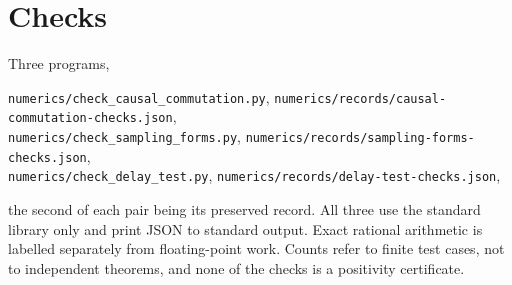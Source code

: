 \section{Checks}\label{app:checks}

Three programs,
\begin{center}
\texttt{numerics/check\_causal\_commutation.py},\qquad
\texttt{numerics/records/causal-commutation-checks.json},\\[2pt]
\texttt{numerics/check\_sampling\_forms.py},\qquad
\texttt{numerics/records/sampling-forms-checks.json},\\[2pt]
\texttt{numerics/check\_delay\_test.py},\qquad
\texttt{numerics/records/delay-test-checks.json},
\end{center}
the second of each pair being its preserved record. All three use the standard
library only and print JSON to standard output. Exact rational arithmetic is labelled separately
from floating-point work. Counts refer to finite test cases, not to independent
theorems, and none of the checks is a positivity certificate.

